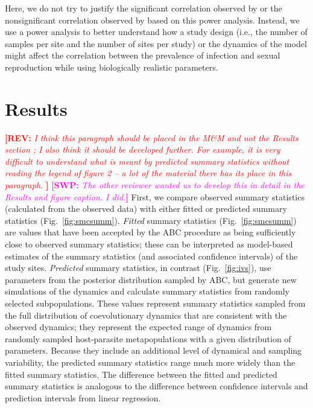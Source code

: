 \documentclass{article}\usepackage[]{graphicx}\usepackage[]{color}
\newcommand{\comment}[3]{\textcolor{#1}{\textbf{[#2: }\textit{#3}\textbf{]}}}
\newcommand{\swp}[1]{\comment{magenta}{SWP}{#1}}
\newcommand{\rev}[1]{\comment{red}{REV}{#1}}
\newcommand{\fref}[1]{Fig.~\ref{fig:#1}}
\begin{document}
Here, we do not try to justify the significant correlation observed by \citep{mckone2016fine} or the nonsignificant correlation observed by \citep{dagan2013clonal} based on this power analysis. 
Instead, we use a power analysis to better understand how a study design (i.e., the number of samples per site and the number of sites per study) or the dynamics of the model might affect the correlation between the prevalence of infection and sexual reproduction while using biologically realistic parameters.

\section{Results}

\rev{
I think this paragraph should be placed in the M\&M and not the Results section ; I also think it should be developed further. For example, it is very difficult to understand what is meant by predicted summary statistics without reading the legend of figure 2 – a lot of the material there has its place in this paragraph.
}
\swp{The other reviewer wanted us to develop this in detail in the Results and figure caption. I did.}
First, we compare observed summary statistics (calculated from the observed data) with either fitted or predicted summary statistics (\fref{smcsumm}).
\emph{Fitted} summary statistics (\fref{smcsumm}) are values that have been accepted by the ABC procedure as being sufficiently close to observed summary statistics;
these can be interpreted as model-based estimates of the summary statistics (and associated confidence intervals) of the study sites.
\emph{Predicted} summary statistics, in contrast (\fref{ivs}), use parameters from the posterior distribution sampled by ABC, but generate new simulations of the dynamics and calculate summary statistics from randomly selected subpopulations.
These values represent summary statistics sampled from the full distribution of coevolutionary dynamics that are consistent with the observed dynamics; they represent the expected range of dynamics from randomly sampled host-parasite metapopulations with a given distribution of parameters.
Because they include an additional level of dynamical and sampling variability, the predicted summary statistics range much more widely than the fitted summary statistics.
The difference between the fitted and predicted summary statistics is analogous to 
the difference between confidence intervals and prediction intervals from 
linear regression.
\end{document}
